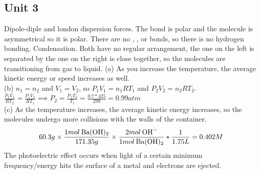 \documentclass{article}
\begin{document}
\subsection{Unit 3}
\AnswerSet
Dipole-diple and london dispersion forces. The  bond is polar and the molecule is asymmetrical so it is polar. There are no , , or  bonds, so there is no hydrogen bonding. 
\AnswerSet
Condensation. Both have no regular arrangement, the one on the left is separated by the one on the right is close together, so the molecules are transitioning from gas to liquid.
\AnswerSet
(a) As you increase the temperature, the average kinetic energy or speed increases as well. \\
(b) \(n_1 = n_2\) and \(V_1 = V_2\), so \(P_1V_1 = n_1RT_1\) and \(P_2V_2 = n_2RT_2\). \(\frac{P_2V_2}{RT_2} = \frac{P_1V_1}{RT_1} \implies P_2 = \frac{P_1T_2}{T_1} = \frac{0.7 * 425}{299} = 0.99atm\)\\
(c) As the temperature increases, the average kinetic energy increases, so the molecules undergo more collisions with the walls of the container.  \\
\AnswerSet
\begin{equation*}
    60.3g \times \frac{1mol\hspace{0.2em}\ce{Ba(OH)2}}{171.35g} \times \frac{2mol\hspace{0.2em}\ce{OH-}}{1mol\hspace{0.2em}\ce{Ba(OH)2}} * \frac{1}{1.75L} = 0.402M
\end{equation*}
\AnswerSet
The photoelectric effect occurs when light of a certain minimum frequency/energy hits the surface of a metal and electrons are ejected. 
\end{document}
